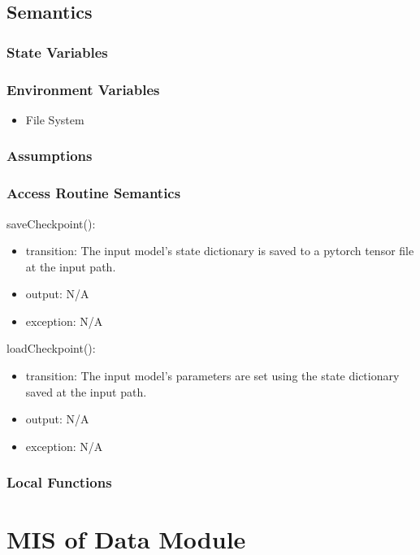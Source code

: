 \documentclass[12pt, titlepage]{article}
\begin{document}
\subsection{Semantics}

\subsubsection{State Variables}



\subsubsection{Environment Variables}

\begin{itemize}
  \item File System
\end{itemize}

\subsubsection{Assumptions}



\subsubsection{Access Routine Semantics}
\noindent saveCheckpoint():
\begin{itemize}
\item transition: The input model's state dictionary is saved to a pytorch tensor file at the input path. 
\item output: N/A
\item exception: N/A
\end{itemize}


\noindent loadCheckpoint():
\begin{itemize}
\item transition: The input model's parameters are set using the state dictionary saved at the input path.
\item output: N/A
\item exception: N/A
\end{itemize}


\subsubsection{Local Functions}

\newpage

\section{MIS of Data Module} \label{Module} 
\end{document}
